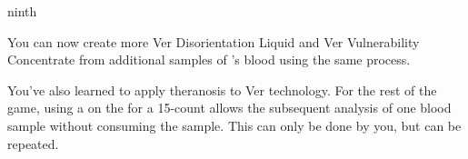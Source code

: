 \documentclass[greennotebook]{guildcamp4} %
\begin{document}
\begin{page}{ninth}

You can now create more Ver Disorientation Liquid and Ver Vulnerability Concentrate from additional samples of \cPlead{}'s blood using the same process. 

You've also learned to apply theranosis to Ver technology. For the rest of the game, using a \iWrench{} on the \sBloodAnalyzer{} for a 15-count allows the subsequent analysis of one blood sample without consuming the sample. This can only be done by you, but can be repeated.

\end{page}

\endnotebook
\end{document}
